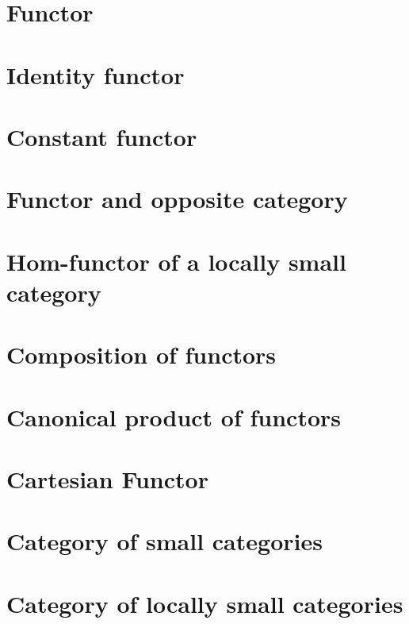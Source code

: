 \section{Functor}
    
\section{Identity functor}
    
\section{Constant functor}
    
\section{Functor and opposite category}
    
\section{Hom-functor of a locally small category}
    
\section{Composition of functors}
    
\section{Canonical product of functors}
    
\section{Cartesian Functor}
    
\section{Category of small categories}
    
\section{Category of locally small categories}
    
